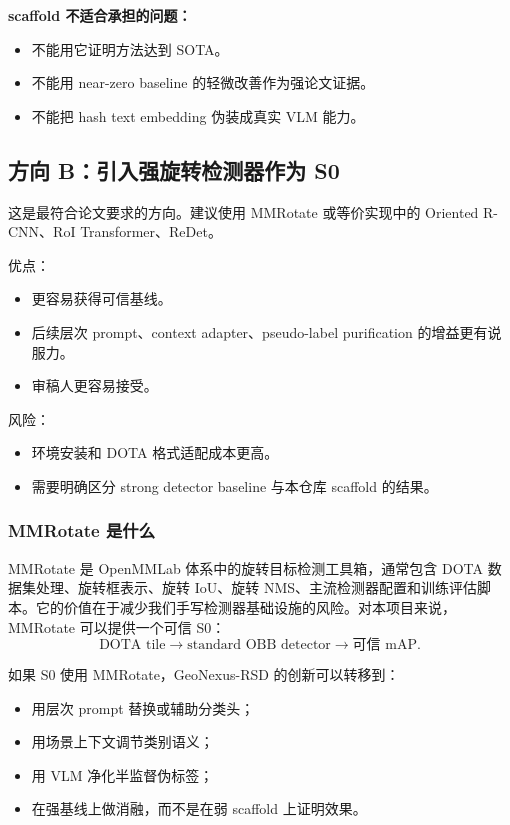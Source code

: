 \documentclass[11pt,a4paper]{ctexart}
\begin{document}
\textbf{scaffold 不适合承担的问题：}
\begin{itemize}
  \item 不能用它证明方法达到 SOTA。
  \item 不能用 near-zero baseline 的轻微改善作为强论文证据。
  \item 不能把 hash text embedding 伪装成真实 VLM 能力。
\end{itemize}

\subsection{方向 B：引入强旋转检测器作为 S0}

这是最符合论文要求的方向。建议使用 MMRotate 或等价实现中的 Oriented R-CNN、RoI Transformer、ReDet。

优点：
\begin{itemize}
  \item 更容易获得可信基线。
  \item 后续层次 prompt、context adapter、pseudo-label purification 的增益更有说服力。
  \item 审稿人更容易接受。
\end{itemize}

风险：
\begin{itemize}
  \item 环境安装和 DOTA 格式适配成本更高。
  \item 需要明确区分 strong detector baseline 与本仓库 scaffold 的结果。
\end{itemize}

\subsubsection*{MMRotate 是什么}

MMRotate 是 OpenMMLab 体系中的旋转目标检测工具箱，通常包含 DOTA 数据集处理、旋转框表示、旋转 IoU、旋转 NMS、主流检测器配置和训练评估脚本。它的价值在于减少我们手写检测器基础设施的风险。对本项目来说，MMRotate 可以提供一个可信 S0：
\[
\text{DOTA tile}\rightarrow\text{standard OBB detector}\rightarrow\text{可信 mAP}.
\]

如果 S0 使用 MMRotate，GeoNexus-RSD 的创新可以转移到：
\begin{itemize}
  \item 用层次 prompt 替换或辅助分类头；
  \item 用场景上下文调节类别语义；
  \item 用 VLM 净化半监督伪标签；
  \item 在强基线上做消融，而不是在弱 scaffold 上证明效果。
\end{itemize}
\end{document}
